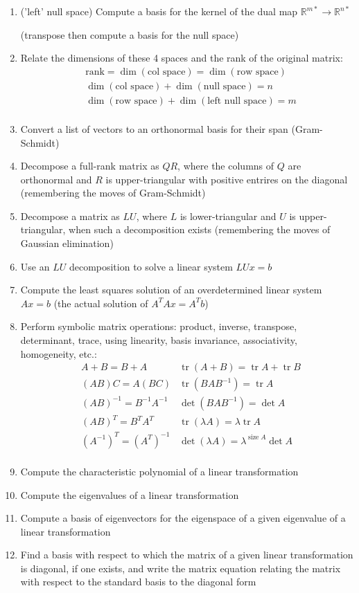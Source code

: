\documentclass[10pt]{article}
\begin{document}
\begin{enumerate}
{(transpose then compute a basis for the column space)}
\item{('left' null space) Compute a basis for the kernel of the dual map $\mathbb{R}^{m*}\rightarrow\mathbb{R}^{n*}$

(transpose then compute a basis for the null space)}
\item{Relate the dimensions of these 4 spaces and the rank of the original matrix:
\begin{align*}
&\text{rank}=\operatorname{dim}(\text{col space})=\operatorname{dim}(\text{row space})\\
&\operatorname{dim}(\text{col space})+\operatorname{dim}(\text{null space})=n\\
&\operatorname{dim}(\text{row space})+\operatorname{dim}(\text{left null space})=m\\
\end{align*}
}
\item{Convert a list of vectors to an orthonormal basis for their span (Gram-Schmidt)}
\item{Decompose a full-rank matrix as $QR$, where the columns of $Q$ are orthonormal and $R$ is upper-triangular with positive entrires on the diagonal (remembering the moves of Gram-Schmidt)}
\item{Decompose a matrix as $LU$, where $L$ is lower-triangular and $U$ is upper-triangular, when such a decomposition exists (remembering the moves of Gaussian elimination)}
\item{Use an $LU$ decomposition to solve a linear system $LUx=b$}
\item{Compute the least squares solution of an overdetermined linear system $Ax=b$ (the actual solution of $A^{T}Ax=A^{T}b$)}
\item{Perform symbolic matrix operations: product, inverse, transpose, determinant, trace, using linearity, basis invariance, associativity, homogeneity, etc.:
\begin{align*}
&A+B=B+A &\operatorname{tr}(A+B)=\operatorname{tr}A+\operatorname{tr}B\\
&(AB)C=A(BC) &\operatorname{tr}(BAB^{-1})=\operatorname{tr}A\\
&(AB)^{-1}=B^{-1}A^{-1} &\operatorname{det}(BAB^{-1})=\operatorname{det}A\\
&(AB)^{T}=B^{T}A^{T} &\operatorname{tr}(\lambda A)=\lambda\operatorname{tr}A\\
&(A^{-1})^{T}=(A^{T})^{-1} &\operatorname{det}(\lambda A)=\lambda^{\operatorname{size}A}\operatorname{det}A\\
\end{align*}}
\item{Compute the characteristic polynomial of a linear transformation}
\item{Compute the eigenvalues of a linear transformation}
\item{Compute a basis of eigenvectors for the eigenspace of a given eigenvalue of a linear transformation}
\item{Find a basis with respect to which the matrix of a given linear transformation is diagonal, if one exists, and write the matrix equation relating the matrix with respect to the standard basis to the diagonal form}
\end{enumerate}
\end{document}
